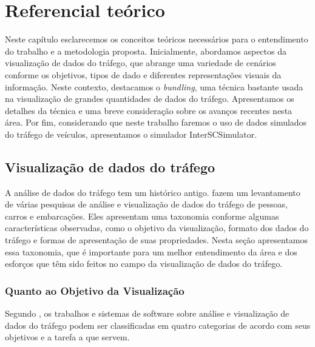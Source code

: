 \chapter{Referencial teórico}
\label{cap:referencial-teorico}

  Neste capítulo esclarecemos os conceitos teóricos necessários para o
entendimento do trabalho e a metodologia proposta. Inicialmente, abordamos
aspectos da visualização de dados do tráfego, que abrange uma variedade de
cenários conforme os objetivos, tipos de dado e diferentes representações
visuais da informação. Neste contexto, destacamos o \emph{bundling}, uma
técnica bastante usada na visualização de grandes quantidades de dados do
tráfego. Apresentamos os detalhes da técnica e uma breve consideração sobre os
avanços recentes nesta área. Por fim, considerando que neste trabalho faremos o
uso de dados simulados do tráfego de veículos, apresentamos o simulador
InterSCSimulator.

\section{Visualização de dados do tráfego}

  A análise de dados do tráfego tem um histórico antigo. \citet{Chen2015} fazem
um levantamento de várias pesquisas de análise e visualização de dados do
tráfego de pessoas, carros e embarcações. Eles apresentam uma taxonomia
conforme algumas características observadas, como o objetivo da visualização,
formato dos dados do tráfego e formas de apresentação de suas propriedades.
Nesta seção apresentamos essa taxonomia, que é importante para um melhor
entendimento da área e dos esforços que têm sido feitos no campo da
visualização de dados do tráfego.

\subsection{Quanto ao Objetivo da Visualização}

  Segundo \citet{Chen2015}, os trabalhos e sistemas de software sobre análise e
visualização de dados do tráfego podem ser classificadas em quatro categorias
de acordo com seus objetivos e a tarefa a que servem.


